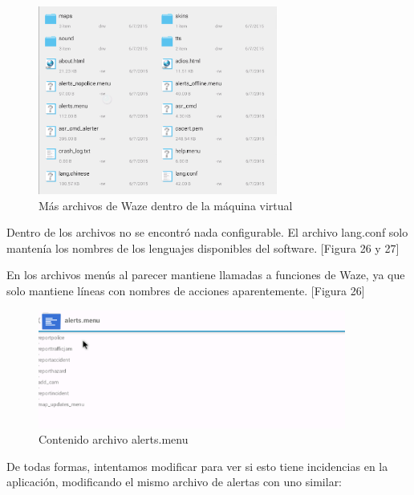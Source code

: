         \begin{figure}[H]
  \begin{center}
    \includegraphics[width=0.7\textwidth]{imagenes/fig39.png}
    \caption{Más archivos de Waze dentro de la máquina virtual}
  \end{center}
\end{figure}

Dentro de los archivos no se encontró nada configurable. El archivo lang.conf solo mantenía los nombres de los lenguajes disponibles del software. [Figura 26 y 27]

En los archivos menús al parecer mantiene llamadas a funciones de Waze, ya que solo mantiene líneas con nombres de acciones aparentemente. [Figura 26]

        \begin{figure}[H]
  \begin{center}
    \includegraphics[width=0.9\textwidth]{imagenes/fig40.png}
    \caption{Contenido archivo alerts.menu}
  \end{center}
\end{figure}

De todas formas, intentamos modificar para ver si esto tiene incidencias en la aplicación, modificando el mismo archivo de alertas con uno similar:


